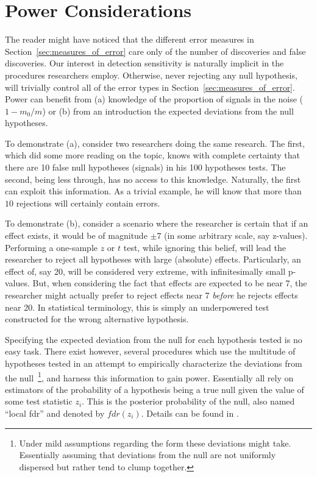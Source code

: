 \documentclass[review,12pt]{article}
\theoremstyle{definition}
\theoremstyle{definition}
\begin{document}
\section{\label{sec:power}Power Considerations}

The reader might have noticed that the different error measures in Section~\ref{sec:measures_of_error} care only of the number of discoveries and false discoveries. Our interest in detection sensitivity is naturally implicit in the procedures researchers employ. Otherwise, never rejecting any null hypothesis, will trivially control all of the error types in Section~\ref{sec:measures_of_error}. 
Power can benefit from (a) knowledge of the proportion of signals in the noise ($ 1 - m_0 / m $) or (b) from an introduction the expected deviations from the null hypotheses. 

To demonstrate (a), consider two researchers doing the same research. The first, which did some more reading on the topic, knows with complete certainty that there are 10 false null hypotheses (signals) in his 100 hypotheses tests. The second, being less through, has no access to this knowledge. 
Naturally, the first can exploit this information. As a trivial example, he will know that  more than $10$ rejections will certainly contain errors. 

To demonstrate (b), consider a scenario where the researcher is certain that if an effect exists, it would be of magnitude $\pm 7$ (in some arbitrary scale, say z-values). Performing a one-sample $z$ or $t$ test, while ignoring this belief, will lead the researcher to reject all hypotheses with large (absolute) effects. Particularly, an effect of, say 20,  will be considered very extreme, with infinitesimally small p-values. But, when considering the fact that effects are expected to be near 7, the researcher might actually prefer to reject effects near 7 \emph{before} he rejects effects near 20. In  statistical terminology, this is simply an underpowered test constructed for the wrong alternative hypothesis. 

Specifying the expected deviation from the null for each hypothesis tested is no easy task. There exist however, several procedures which use the multitude of hypotheses tested in an attempt to empirically characterize the deviations from the null~\footnote{ Under mild assumptions regarding the form these deviations might take. Essentially assuming that deviations from the null are not uniformly dispersed but rather tend to clump together.}, and harness this information to gain power. Essentially all rely on estimators of the probability of a hypothesis being a true null given the value of some test statistic $z_i$. This is the posterior probability of the null, also named ``local fdr'' and denoted by $fdr(z_i)$. Details can be found in \cite{efron_microarrays_2008}. 
\end{document}
